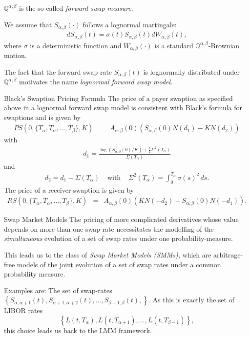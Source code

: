 	$\mathbb Q^{\alpha,\beta}$ is the so-called {\em forward swap measure}.

	We assume that $S_{\alpha,\beta}(\cdot)$ follows a
	lognormal martingale:
		\begin{eqnarray*}
		dS_{\alpha,\beta}(t) = \sigma (t) S_{\alpha,\beta}(t)
		dW_{\alpha,\beta}(t),
		\end{eqnarray*}
	where $\sigma$ is a deterministic function and
	$W_{\alpha,\beta}(\cdot)$ is a standard $\mathbb
	Q^{\alpha,\beta}$-Brownian motion.
 
	The fact that the forward swap
	rate $S_{\alpha,\beta}(t)$ is lognormally distributed under
	$\mathbb Q^{\alpha,\beta}$ motivates the name {\em lognormal
	forward swap model.}


Black's Swaption Pricing Formula
	The price of a payer swaption as specified
	above in a lognormal forward swap model is consistent with Black's
	formula for swaptions and is given by
		\begin{eqnarray*}
		PS(0,\{T_\alpha,{T_\alpha,\dots,T_\beta}\},K) & = &
		A_{\alpha,\beta}(0) \left( S_{\alpha,\beta}(0) N(d_1)-K N(d_2)
		\right)
		\end{eqnarray*}
	with
		\begin{eqnarray*}
		d_1=\frac{ \log (S_{\alpha,\beta}(0)/K
		)+\frac{1}{2}\Sigma^2(T_\alpha)} {\Sigma(T_\alpha)}
		\end{eqnarray*}
	and
		\begin{eqnarray*}
		d_2=d_1-\Sigma(T_\alpha) & \mbox{ with } & \Sigma^2(T_\alpha) =
		\int_0^{T_\alpha} \sigma(s)^2 \, ds.
		\end{eqnarray*}
	The price of a receiver-swaption is given by
		\begin{eqnarray*}
		RS(0,\{T_\alpha,{T_\alpha,\dots,T_\beta}\},K) & = &
		A_{\alpha,\beta}(0) \left(K N(-d_2) - S_{\alpha,\beta}(0) N(-d_1)
		\right).
		\end{eqnarray*}


Swap Market Models
	The pricing of more complicated derivatives
	whose value depends on more than one swap-rate necessitates the
	modelling of the {\em simultaneous} evolution of a set of swap
	rates under one probability-measure.
 
	This leads us to the class of
	{\em Swap Market Models (SMMs),} which are arbitrage-free models
	of the joint evolution of a set of swap rates under a common
	probability measure.

	Examples  are:
	The set of swap-rates 
		$ 
		\left\{S_{\alpha,\alpha+1}(t),S_{\alpha+1,\alpha+2}(t),\dots,S_{\beta-1,\beta}(t), \right\}.
		$ 
	As this is exactly the set of LIBOR rates
		$$ 
		\left\{ L(t,T_\alpha),
		L(t,T_{\alpha+1}), \dots, L(t,T_{\beta-1}) \right\},
		$$ 
	this choice leads us back to the LMM framework.
 

